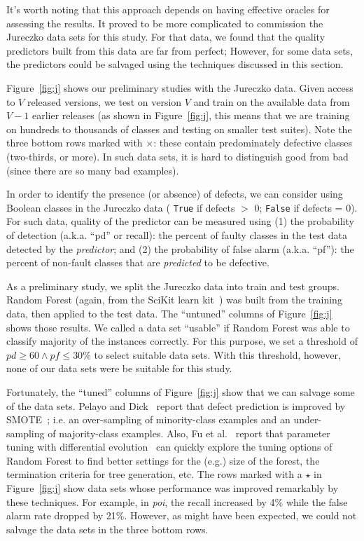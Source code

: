 \documentclass{sig-alternate}
\newcommand{\fig}[1]{Figure~\ref{fig:#1}}
\begin{document}
It's worth noting that this approach depends on having effective oracles for assessing the results. It proved to be more complicated to commission the Jureczko data sets for this study. For that data, we found that the quality predictors built from this data are far from perfect; However, for some data sets, the  predictors could be salvaged using the techniques discussed in this section.

\fig{j} shows our preliminary studies with the Jureczko data. Given access to $V$ released versions, we test on version $V$ and train on the available data from $V-1$ earlier releases (as shown in \fig{j}, this means that we are training on hundreds to thousands of classes and testing on smaller test suites). Note the   \colorbox{lavenderpink}{three bottom} \colorbox{lavenderpink}{rows}   marked with $\times$: these contain predominately defective classes (two-thirds, or more).  In such data sets, it is hard to distinguish good from bad (since there are so many bad examples). 

In order to identify the presence (or absence) of defects, we can consider using Boolean classes in the  Jureczko data ( \texttt{True} if defects $\gt$ 0; \texttt{False} if defects = 0). For such data, quality of the predictor can be measured using (1) the  probability of detection (a.k.a. ``pd'' or recall):  the percent of faulty classes in the test data detected by the {\em predictor}; and (2) the  probability of false alarm (a.k.a. ``pf''): the percent of non-fault classes that are {\em predicted} to be defective.

As a preliminary study, we split the Jureczko  data into train and test groups. Random Forest (again, from the SciKit learn kit~\cite{Pedregosa2012}) was built from the training data, then applied to the test data. The ``untuned'' columns of \fig{j} shows those results. We called a data set ``usable'' if Random Forest was able to classify majority of the instances correctly. For this purpose, we set a threshold of $\mathit{pd}\ge 60 \wedge \mathit{pf} \le 30$\% to select suitable data sets. With this threshold, however, none of our data sets were be suitable for this study.

Fortunately, the ``tuned'' columns of \fig{j} show that we can salvage some of the data sets. Pelayo and Dick~\cite{pelayo07} report that defect prediction is improved by SMOTE~\cite{Chawla2002}; i.e. an over-sampling of minority-class examples and an under-sampling of majority-class examples. Also, Fu et al.~\cite{fu:ase15} report that parameter tuning with differential evolution~\cite{storn97} can quickly explore the tuning options of Random Forest to find better settings for the (e.g.) size of the forest, the termination criteria
for tree generation, etc. The rows \colorbox{celadon}{marked with a $\star$} in \fig{j} show data sets whose performance was improved remarkably by these techniques. For example, in {\em poi}, the recall increased by 4\% while the false alarm rate dropped by 21\%. However,  as might have been expected, we could not salvage the data sets in the  three bottom rows.
\end{document}
